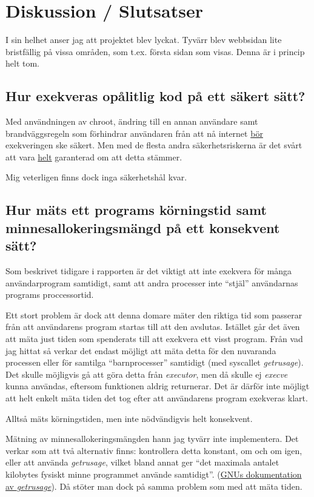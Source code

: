 \documentclass{article}
\begin{document}
\section{Diskussion / Slutsatser}

I sin helhet anser jag att projektet blev lyckat. Tyvärr blev webbsidan lite
bristfällig på vissa områden, som t.ex. första sidan som visas. Denna är i
princip helt tom.

\subsection{Hur exekveras opålitlig kod på ett säkert sätt?}

Med användningen av chroot, ändring till en annan användare samt
brandväggsregeln som förhindrar användaren från att nå internet \underline{bör}
exekveringen ske säkert. Men med de flesta andra säkerhetsriskerna är det svårt
att vara \underline{helt} garanterad om att detta stämmer.

Mig veterligen finns dock inga säkerhetshål kvar.

\subsection{Hur mäts ett programs körningstid samt minnesallokeringsmängd på
	ett konsekvent sätt?}

Som beskrivet tidigare i rapporten är det viktigt att inte exekvera för många
användarprogram samtidigt, samt att andra processer inte ``stjäl'' användarnas
programs proccessortid.

Ett stort problem är dock att denna domare mäter den riktiga tid som passerar
från att användarens program startas till att den avslutas. Istället går det
även att mäta just tiden som spenderats till att exekvera ett visst program.
Från vad jag hittat så verkar det endast möjligt att mäta detta för den
nuvaranda processen eller för samtilga ``barnprocesser'' samtidigt (med
syscallet \textit{getrusage}). Det skulle möjligvis gå att göra detta från
\textit{executor}, men då skulle ej \textit{execve} kunna användas, eftersom
funktionen aldrig returnerar. Det är därför inte möjligt att helt enkelt mäta
tiden det tog efter att användarens program exekveras klart.

Alltså mäts körningstiden, men inte nödvändigvis helt konsekvent.

Mätning av minnesallokeringsmängden hann jag tyvärr inte implementera. Det
verkar som att två alternativ finns: kontrollera detta konstant, om och om igen,
eller att använda \textit{getrusage}, vilket bland annat ger ``det maximala
antalet kilobytes fysiskt minne programmet använde samtidigt''.
(\href{https://www.gnu.org/savannah-checkouts/gnu/libc/manual/html_node/Resource-Usage.html#Resource-Usage}{GNUs
dokumentation av \textit{getrusage}}). Då stöter man dock på samma problem som
med att mäta tiden.
\end{document}
